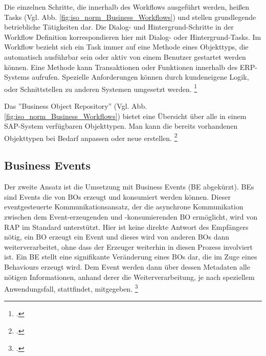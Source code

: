 Die einzelnen Schritte, die innerhalb des Workflows ausgeführt werden, hei{\ss}en Tasks (Vgl. Abb. \ref{fig:iso_norm_Business_Workflows}) und stellen grundlegende betriebliche Tätigkeiten dar. Die Dialog- und Hintergrund-Schritte in der Workflow Definition korrespondieren hier mit Dialog- oder Hintergrund-Tasks. Im Workflow bezieht sich ein Task immer auf eine Methode eines Objekttyps, die automatisch ausführbar sein oder aktiv von einem Benutzer gestartet werden können. Eine Methode kann Transaktionen oder Funktionen innerhalb des ERP-Systems aufrufen. Spezielle Anforderungen können durch kundeneigene Logik, oder Schnittstellen zu anderen Systemen umgesetzt werden. \footcite[Vgl.][]{sap_business-workflows_2022-1}

Das ''Business Object Repository'' (Vgl. Abb. \ref{fig:iso_norm_Business_Workflows}) bietet eine Übersicht über alle in einem SAP-System verfügbaren Objekttypen. Man kann die bereits vorhandenen Objekttypen bei Bedarf anpassen oder neue erstellen. \footcite[Vgl.][]{sap_business-workflows_2022-1}

\subsection{Business Events}

Der zweite Ansatz ist die Umsetzung mit Business Events (BE abgekürzt). BEs sind Events die von BOs erzeugt und konsumiert werden können. Dieser eventgesteuerte Kommunikationsansatz, der die asynchrone Kommunikation zwischen dem Event-erzeugenden und -konsumierenden BO ermöglicht, wird von RAP im Standard unterstützt. Hier ist keine direkte Antwort des Empfängers nötig, ein BO erzeugt ein Event und dieses wird von anderen BOs dann weiterverarbeitet, ohne dass der Erzeuger weiterhin in diesen Prozess involviert ist. 
Ein BE stellt eine signifikante Veränderung eines BOs dar, die im Zuge eines Behaviours erzeugt wird. Dem Event werden dann über dessen Metadaten alle nötigen Informationen, anhand derer die Weiterverarbeitung, je nach speziellem Anwendungsfall, stattfindet, mitgegeben. \footcite[Vgl.][]{sap_business-events_2023}

